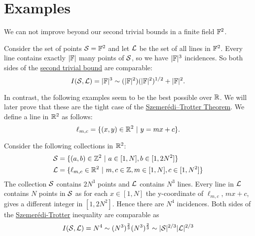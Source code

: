 \section{Examples}
We can not improve beyond our second trivial bounds in a finite field $\mathbb F^2$. 
\begin{example}
Consider the set of points $\mathcal S=\mathbb F^2$ and let $\mathcal L$ be the set of all lines 
in $\mathbb F^2$. Every line contains exactly $|\mathbb F|$ many points of $\mathcal S$, so we have $|\mathbb F|^3$ incidences. 
So both sides of the \hyperref[thm:pretty-trivial-ST-bounds]{second trivial bound} are comparable:
$$
I(\mathcal S,\mathcal L) = |\mathbb F|^3 \sim (|\mathbb F|^2)(|\mathbb F|^2)^{1/2} + |\mathbb F|^2.
$$
\end{example}
In contrast, the following examples seem to be the best possible over $\mathbb R$. We will later prove that these are the tight case of the \hyperref[thm:S-T]{Szemerédi–Trotter Theorem}.
We define a line in $\mathbb R^2$ as follows:
\[
    \ell_{m,c} = \{(x,y) \in \mathbb R^2 \ | \ y = mx+c\}.     
\]
\begin{example}
    Consider the following collections in $\mathbb R^2$:
    \begin{align*}
    \mathcal S &= \{ (a,b) \in \mathbb Z^2 \ | \ a\in [1,N], b \in [1,2N^2] \} \\
    \mathcal L &= \{ \ell_{m,c} \in \mathbb R^2 \ | \ m,c\in \mathbb Z, m\in [1,N], c \in [1,N^2] \} \end{align*}
    The collection $\mathcal S$ contains $2N^3$ points and $\mathcal L$ contains $N^3$ lines. Every line in $\mathcal L$ contains $N$ points in $\mathcal S$ as for each $x \in [1,N]$  the y-coordinate of $\ell_{m,c}$, $ mx+c$, gives a different integer in $[1,2N^2]$.
    Hence there are $N^4$ incidences. Both sides of the \hyperref[thm:S-T]{Szemerédi-Trotter} inequality are comparable as 
    $$ I(\mathcal S,\mathcal L) = N^4 \sim (N^3)^{\frac{2}{3}} (N^3)^{\frac{2}{3}} \sim |\mathcal S|^{2/3} |\mathcal L|^{2/3}$$
\end{example}
